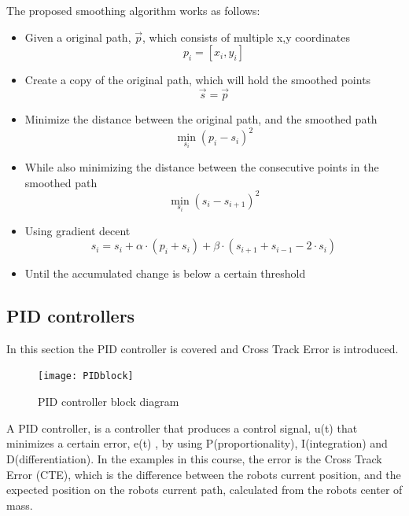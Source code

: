 \documentclass[Main]{subfiles}
\begin{document}
The proposed smoothing algorithm works as follows:
\begin{itemize}
	\item Given a original path, $\overrightarrow{p}$, which consists of multiple x,y coordinates
	\begin{equation}
		p_i = [x_i,y_i]
	\end{equation}
	\item Create a copy of the original path, which will hold the smoothed points
	\begin{equation}
		\overrightarrow{s} = \overrightarrow{p}
	\end{equation}
	\item Minimize the distance between the original path, and the smoothed path
	\begin{equation}
		\min_{s_i}(p_i-s_i)^2
	\end{equation}
	\item While also minimizing the distance between the consecutive points in the smoothed path
	\begin{equation}
		\min_{s_i}(s_i-s_{i+1})^2
	\end{equation}
	\item Using gradient decent
	\begin{equation}
		s_i = s_i + \alpha \cdot (p_i + s_i) + \beta \cdot (s_{i+1} + s_{i-1} - 2 \cdot s_i)
	\end{equation}
	\item Until the accumulated change is below a certain threshold
\end{itemize}

\subsection{PID controllers}
In this section the PID controller is covered and Cross Track Error is introduced.
\begin{figure}[H]
	\centering
	\texttt{[image: PIDblock]}
	\caption{PID controller block diagram}
	\label{fig:pid_controller}
\end{figure}\noindent
A PID controller, is a controller that produces a control signal, u(t)  that minimizes a certain error, e(t) , by using P(proportionality), I(integration) and D(differentiation). 
In the examples in this course, the error is the Cross Track Error (CTE), which is the difference between the robots current position, and the expected position on the robots current path, calculated from the robots center of mass.
\end{document}
